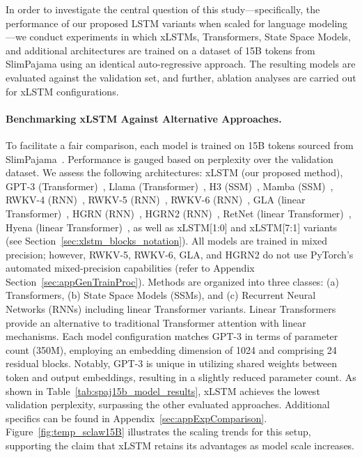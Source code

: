 In order to investigate the central question of this study—specifically, the performance of our proposed LSTM variants when scaled for language modeling—we conduct experiments in which xLSTMs, Transformers, State Space Models, and additional architectures are trained on a dataset of 15B tokens from SlimPajama using an identical auto-regressive approach. The resulting models are evaluated against the validation set, and further, ablation analyses are carried out for xLSTM configurations.

\paragraph{Benchmarking xLSTM Against Alternative Approaches.} To facilitate a fair comparison, each model is trained on 15B tokens sourced from SlimPajama~\citep{Soboleva:23}. Performance is gauged based on perplexity over the validation dataset. We assess the following architectures: xLSTM (our proposed method), GPT-3 (Transformer)~\citep{Brown:20short}, Llama (Transformer)~\citep{Touvron:23arxiv}, H3 (SSM)~\citep{Fu:23}, Mamba (SSM)~\citep{Gu:24arxiv}, RWKV-4 (RNN)~\citep{Peng:23arxivshort}, RWKV-5 (RNN)~\citep{Peng:24arxivshort}, RWKV-6 (RNN)~\citep{Peng:24arxivshort}, GLA (linear Transformer)~\citep{Yang:23arxiv}, HGRN (RNN)~\citep{Qin:23}, HGRN2 (RNN)~\citep{Qin:24arxiv}, RetNet (linear Transformer)~\citep{Sun:23arxiv}, Hyena (linear Transformer)~\citep{Poli:23}, as well as xLSTM[1:0] and xLSTM[7:1] variants (see Section~\ref{sec:xlstm_blocks_notation}). 
All models are trained in mixed precision; however, RWKV-5, RWKV-6, GLA, and HGRN2 do not use PyTorch’s automated mixed-precision capabilities (refer to Appendix Section~\ref{sec:appGenTrainProc}). 
Methods are organized into three classes: (a) Transformers, (b) State Space Models (SSMs), and (c) Recurrent Neural Networks (RNNs) including linear Transformer variants. Linear Transformers provide an alternative to traditional Transformer attention with linear mechanisms. Each model configuration matches GPT-3 in terms of parameter count (350M), employing an embedding dimension of 1024 and comprising 24 residual blocks. Notably, GPT-3 is unique in utilizing shared weights between token and output embeddings, resulting in a slightly reduced parameter count. 
As shown in Table~\ref{tab:spaj15b_model_results}, xLSTM achieves the lowest validation perplexity, surpassing the other evaluated approaches. Additional specifics can be found in Appendix~\ref{sec:appExpComparison}. Figure~\ref{fig:temp_sclaw15B} illustrates the scaling trends for this setup, supporting the claim that xLSTM retains its advantages as model scale increases.

